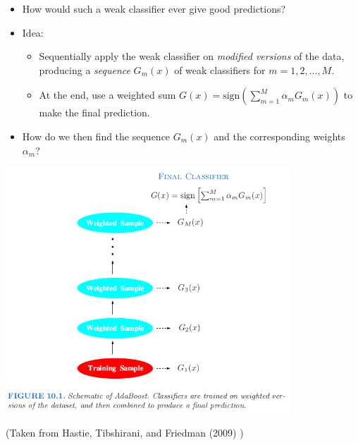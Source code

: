 \documentclass[
  10pt,
  ignorenonframetext,
]{beamer}
\providecommand{\tightlist}{%
  \setlength{\itemsep}{0pt}\setlength{\parskip}{0pt}}
\begin{document}
\begin{frame}
\vspace{2mm}

\begin{itemize}
\tightlist
\item
  How would such a weak classifier ever give good predictions?
\end{itemize}

\vspace{2mm}

\begin{itemize}
\tightlist
\item
  Idea:

  \begin{itemize}
  \tightlist
  \item
    Sequentially apply the weak classifier on \emph{modified versions}
    of the data, producing a \emph{sequence} \(G_m(x)\) of weak
    classifiers for \(m=1,2,\ldots,M\).
  \item
    At the end, use a weighted sum
    \(G(x)=\text{sign}\left( \sum_{m=1}^M \alpha_m G_m(x)\right)\) to
    make the final prediction.
  \end{itemize}
\end{itemize}

\vspace{2mm}

\begin{itemize}
\tightlist
\item
  How do we then find the sequence \(G_m(x)\) and the corresponding
  weights \(\alpha_m\)?
\end{itemize}
\end{frame}

\begin{frame}
\centering

\includegraphics[width=0.8\textwidth,height=\textheight]{fig10_1_elements.png}

\small

(Taken from Hastie, Tibshirani, and Friedman (2009) )
\end{frame}
\end{document}

